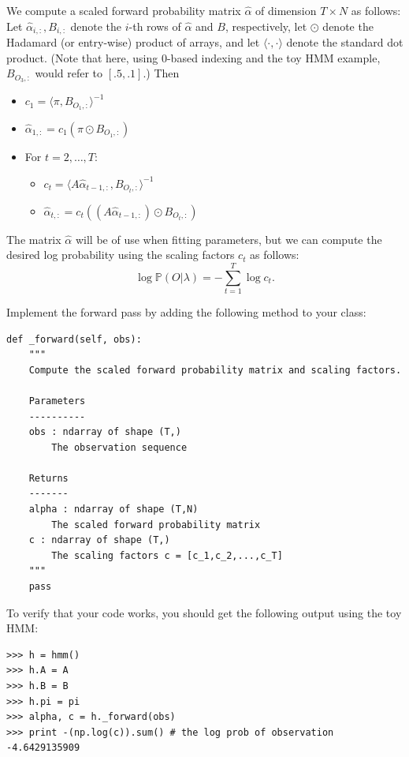 We compute a scaled forward probability matrix $\widehat{\alpha}$ of dimension $T \times N$ as follows:
Let $\widehat{\alpha}_{i,:}, B_{i,:}$ denote the $i$-th rows of $\widehat{\alpha}$ and $B$, respectively, let $\odot$ denote the Hadamard (or entry-wise) product of arrays,
and let $\langle \cdot, \cdot \rangle$ denote the standard dot product.
(Note that here, using 0-based indexing and the toy HMM example, $B_{O_3,:}$ would refer to $[.5,.1]$.)
Then
\begin{itemize}
 \item $c_1 = \langle \pi, B_{O_1,:}\rangle^{-1}$
 \item $\widehat{\alpha}_{1,:} = c_1(\pi\odot B_{O_1,:})$
 \item For $t = 2, \ldots, T$:
 \begin{itemize}[]
     \item $c_t = \langle A\widehat{\alpha}_{t-1,:}, B_{O_t,:}\rangle^{-1}$
	 \item $\widehat{\alpha}_{t,:} = c_t((A\widehat{\alpha}_{t-1,:})\odot B_{O_t,:})$
 \end{itemize}
\end{itemize}
The matrix $\widehat{\alpha}$ will be of use when fitting parameters, but we can compute the desired log probability using the scaling factors $c_t$ as follows:
\[
\log \mathbb{P}(O | \lambda) = -\sum_{t=1}^T \log c_t.
\]

\begin{problem}
Implement the forward pass by adding the following method to your class:
\begin{lstlisting}
def _forward(self, obs):
    """
    Compute the scaled forward probability matrix and scaling factors.

    Parameters
    ----------
    obs : ndarray of shape (T,)
        The observation sequence

    Returns
    -------
    alpha : ndarray of shape (T,N)
        The scaled forward probability matrix
    c : ndarray of shape (T,)
        The scaling factors c = [c_1,c_2,...,c_T]
    """
    pass
\end{lstlisting}
To verify that your code works, you should get the following output using the toy HMM:
\begin{lstlisting}
>>> h = hmm()
>>> h.A = A
>>> h.B = B
>>> h.pi = pi
>>> alpha, c = h._forward(obs)
>>> print -(np.log(c)).sum() # the log prob of observation
-4.6429135909
\end{lstlisting}
\end{problem}

